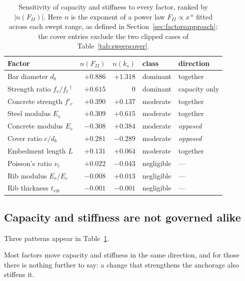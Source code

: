 \begin{table}[H]
\centering
\caption{Sensitivity of capacity and stiffness to every factor, ranked by
         $|n(F_{II})|$. Here $n$ is the exponent of a power law
         $F_{II} \propto x^{\,n}$ fitted across each swept range, as
         defined in Section~\ref{sec:factorsapproach}; the cover entries exclude
         the two clipped cases of Table~\ref{tab:sweepcover}.}
\label{tab:stiffsens}
\small
\begin{tabular*}{\linewidth}{@{\extracolsep{\fill}}lrrll@{}}
\hline
Factor & $n(F_{II})$ & $n(k_s)$ & class & direction \\
\hline
Bar diameter $d_b$           & $+0.886$ & $+1.318$ & dominant   & together \\
Strength ratio $f_v/f_t$\,$^{\dagger}$ & $+0.615$ & $0$ & dominant & capacity only \\
Concrete strength $f'_c$     & $+0.390$ & $+0.137$ & moderate   & together \\
Steel modulus $E_s$          & $+0.309$ & $+0.615$ & moderate   & together \\
Concrete modulus $E_c$       & $-0.308$ & $+0.384$ & moderate   & \emph{opposed} \\
Cover ratio $c/d_b$          & $+0.281$ & $-0.289$ & moderate   & \emph{opposed} \\
Embedment length $L$         & $+0.131$ & $+0.064$ & moderate   & together \\
Poisson's ratio $\nu_c$      & $+0.022$ & $-0.043$ & negligible & --- \\
Rib modulus $E_r/E_c$        & $-0.008$ & $+0.013$ & negligible & --- \\
Rib thickness $t_{rib}$      & $-0.001$ & $-0.001$ & negligible & --- \\
\hline
\end{tabular*}
\end{table}
 
\subsection{Capacity and stiffness are not governed alike}
 
Three patterns appear in Table~\ref{tab:stiffsens}.
 
Most factors move capacity and stiffness in the same direction, and for
those there is nothing further to say: a change that strengthens the
anchorage also stiffens it.
 
